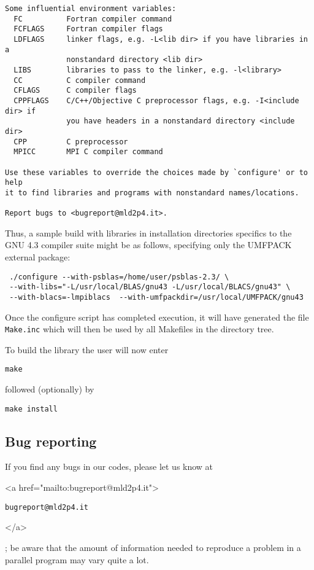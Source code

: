 \begin{verbatim}
Some influential environment variables:
  FC          Fortran compiler command
  FCFLAGS     Fortran compiler flags
  LDFLAGS     linker flags, e.g. -L<lib dir> if you have libraries in a
              nonstandard directory <lib dir>
  LIBS        libraries to pass to the linker, e.g. -l<library>
  CC          C compiler command
  CFLAGS      C compiler flags
  CPPFLAGS    C/C++/Objective C preprocessor flags, e.g. -I<include dir> if
              you have headers in a nonstandard directory <include dir>
  CPP         C preprocessor
  MPICC       MPI C compiler command

Use these variables to override the choices made by `configure' or to help
it to find libraries and programs with nonstandard names/locations.

Report bugs to <bugreport@mld2p4.it>.
\end{verbatim}
Thus, a sample build with libraries in installation
directories specifics to the GNU 4.3 compiler suite might be as
follows, specifying only the UMFPACK external package: 
\begin{verbatim}
 ./configure --with-psblas=/home/user/psblas-2.3/ \
 --with-libs="-L/usr/local/BLAS/gnu43 -L/usr/local/BLACS/gnu43" \
 --with-blacs=-lmpiblacs  --with-umfpackdir=/usr/local/UMFPACK/gnu43 
\end{verbatim}
Once the configure script has completed execution, it will have
generated the file \verb|Make.inc| which will then be used by all
Makefiles in the directory tree. 

To build the library the user will now enter 
\begin{verbatim}
make
\end{verbatim}
followed (optionally) by 
\begin{verbatim}
make install
\end{verbatim}
\subsection{Bug reporting}
If you find any bugs in our codes, please let us know at
\begin{rawhtml}
<a href="mailto:bugreport@mld2p4.it">
\end{rawhtml}
\texttt{bugreport@mld2p4.it}
\begin{rawhtml}
</a>
\end{rawhtml}
; be aware that  
the amount of information needed to reproduce a problem in a parallel
program may vary quite a lot. 
